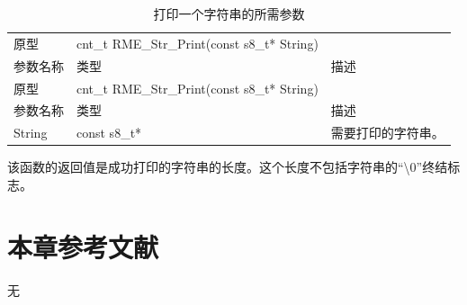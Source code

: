 \begin{xltabular}{\textwidth}{@{}>{\hsize\raggedright\arraybackslash}X>{\hsize\raggedright\arraybackslash}X>{\hsize\raggedright\arraybackslash}X@{}}
\caption{打印一个字符串的所需参数}\label{tab:7-90-print-string-parameters}\\
\toprule
原型 & cnt\_t RME\_Str\_Print(const s8\_t* String) &\tabularnewline
参数名称 & 类型 & 描述\tabularnewline
\endfirsthead
\toprule
原型 & cnt\_t RME\_Str\_Print(const s8\_t* String) &\tabularnewline
参数名称 & 类型 & 描述\tabularnewline
\midrule
\endhead
\bottomrule
\endlastfoot
String & const s8\_t* & 需要打印的字符串。\tabularnewline
\end{xltabular}

该函数的返回值是成功打印的字符串的长度。这个长度不包括字符串的``\textbackslash0''终结标志。

\section{本章参考文献}\label{sec:7-chapter-bibliography}

无

